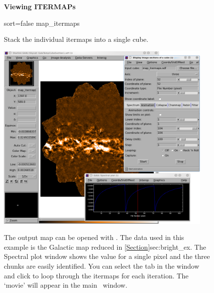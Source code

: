 \begin{figure}[ht!]
\begin{center}
\begin{fmpage}{0.95\linewidth}
\vspace{0.2cm}
\hspace{2mm}
\textbf{Viewing ITERMAPs}
\minipageclear
\vspace{0.5cm}

\begin{minipage}[c]{0.65\linewidth}

\begin{terminalv}
sort=false map_itermaps
\end{terminalv}
\end{minipage}
\hspace{0.3cm}
\begin{minipage}[c]{0.29\linewidth}
Stack the individual itermaps into a single cube.
\end{minipage}
\minipageclear

\vspace{0.5cm}

\begin{minipage}[c]{0.65\linewidth}
\centering
\includegraphics[width=0.95\textwidth]{sc21_itermaps_anim}
\end{minipage}
\hspace{0.3cm}
\begin{minipage}[c]{0.29\linewidth}
The output map  can be opened with \gaia. The data used
in this example is the Galactic map reduced in
\cref{Section}{sec:bright_ex}{}. The
Spectral plot window shows the value for a single pixel and the three
chunks are easily identified. You can select the  tab
in the  window and click
 to loop through the itermaps for each iteration.  The
`movie' will appear in the main \gaia\ window.
\end{minipage}
\minipageclear


\end{fmpage}
\end{center}
\end{figure}

